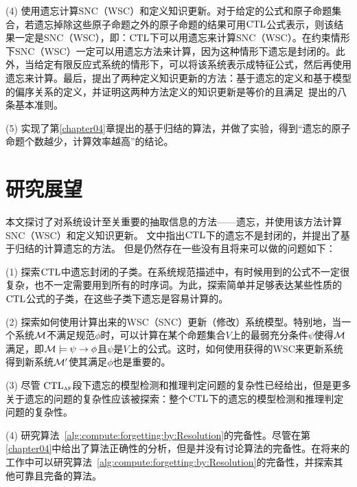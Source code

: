 (4) 使用遗忘计算SNC（WSC）和定义知识更新。对于给定的公式和原子命题集合，若遗忘掉除这些原子命题之外的原子命题的结果可用$\textrm{CTL}$公式表示，则该结果一定是SNC（WSC），即：$\textrm{CTL}$下可以用遗忘来计算SNC（WSC）。在约束情形下SNC（WSC）一定可以用遗忘方法来计算，因为这种情形下遗忘是封闭的。此外，当给定有限反应式系统的情形下，可以将该系统表示成特征公式，然后再使用遗忘来计算。最后，提出了两种定义知识更新的方法：基于遗忘的定义和基于模型的偏序关系的定义，并证明这两种方法定义的知识更新是等价的且满足~\citeauthor{katsuno91mendelzon}提出的八条基本准则。

(5) 实现了第\ref{chapter04}章提出的基于归结的算法，并做了实验，得到“遗忘的原子命题个数越少，计算效率越高”的结论。



\section{研究展望}
本文探讨了对系统设计至关重要的抽取信息的方法——遗忘，并使用该方法计算SNC（WSC）和定义知识更新。
文中指出$\textrm{CTL}$下的遗忘不是封闭的，并提出了基于归结的计算遗忘的方法。
但是仍然存在一些没有且将来可以做的问题如下：

(1) 探索$\textrm{CTL}$中遗忘封闭的子类。在系统规范描述中，有时候用到的公式不一定很复杂，也不一定需要用到所有的时序词。为此，探索简单并足够表达某些性质的$\textrm{CTL}$公式的子类，在这些子类下遗忘是容易计算的。

(2) 探索如何使用计算出来的WSC（SNC）更新（修改）系统模型。特别地，当一个系统$\cal M$不满足规范$\phi$时，可以计算在某个命题集合$V$上的最弱充分条件$\psi$使得${\cal M}$满足，即${\cal M}\models\psi\rightarrow \phi$且$\psi$是$V$上的公式。这时，如何使用获得的WSC来更新系统得到新系统${\cal M}'$使其满足$\phi$也是重要的。


(3) 尽管 $\textrm{CTL}_{\textsc{a}\textsc{f}}$段下遗忘的模型检测和推理判定问题的复杂性已经给出，但是更多关于遗忘的问题的复杂性应该被探索：整个$\textrm{CTL}$下的遗忘的模型检测和推理判定问题的复杂性。

(4) 研究算法~\ref{alg:compute:forgetting:by:Resolution}的完备性。尽管在第\ref{chapter04}中给出了算法正确性的分析，但是并没有讨论算法的完备性。在将来的工作中可以研究算法~\ref{alg:compute:forgetting:by:Resolution}的完备性，并探索其他可靠且完备的算法。


